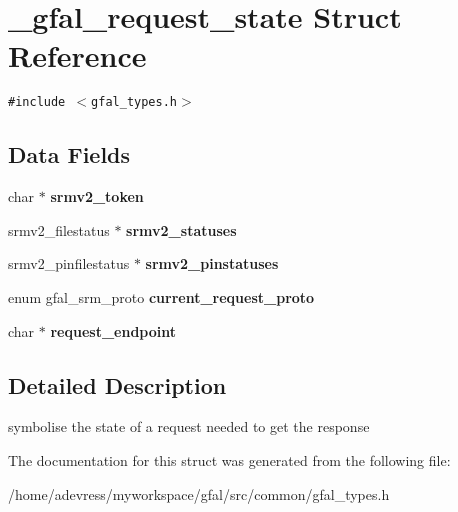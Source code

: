 \section{\_\-gfal\_\-request\_\-state Struct Reference}
\label{struct__gfal__request__state}
{\tt \#include $<$gfal\_\-types.h$>$}

\subsection*{Data Fields}
\begin{CompactItemize}
\item 
char $\ast$ \textbf{srmv2\_\-token}\label{struct__gfal__request__state_fb894137417d237a47ad4fe38a3acede}

\item 
srmv2\_\-filestatus $\ast$ \textbf{srmv2\_\-statuses}\label{struct__gfal__request__state_dd7a800ece5d4f08656d6ebb399d333b}

\item 
srmv2\_\-pinfilestatus $\ast$ \textbf{srmv2\_\-pinstatuses}\label{struct__gfal__request__state_882d10ccee4ae1a8a639cde3584b9ac9}

\item 
enum gfal\_\-srm\_\-proto \textbf{current\_\-request\_\-proto}\label{struct__gfal__request__state_e5053321643c3fc69f4a6d13878eed1a}

\item 
char $\ast$ \textbf{request\_\-endpoint}\label{struct__gfal__request__state_9125ea45c8376bf0d5e960726319934e}

\end{CompactItemize}


\subsection{Detailed Description}
symbolise the state of a request needed to get the response 



The documentation for this struct was generated from the following file:\begin{CompactItemize}
\item 
/home/adevress/myworkspace/gfal/src/common/gfal\_\-types.h\end{CompactItemize}
